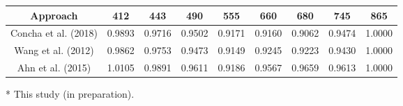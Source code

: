\documentclass[preview]{standalone}
\begin{document}
\begin{threeparttable}

\normalsize
\centering
\begin{tabular}{ccccccccc} 
 \hline 
Approach 			& 412 	 & 443 	  & 490    & 555    & 660    & 680    & 745    & 865    \\ \hline
Concha et al. (2018)\tnote{*} & 0.9893 & 0.9716 & 0.9502 & 0.9171 & 0.9160 & 0.9062 & 0.9474 & 1.0000 \\
Wang et al. (2012) 	& 0.9862 & 0.9753 & 0.9473 & 0.9149 & 0.9245 & 0.9223 & 0.9430 & 1.0000 \\
Ahn et al. (2015) 	& 1.0105 & 0.9891 & 0.9611 & 0.9186 & 0.9567 & 0.9659 & 0.9613 & 1.0000 \\

\hline 
\end{tabular}
\begin{tablenotes}\small
\item [*] This study (in preparation).
\end{tablenotes}
\end{threeparttable}
\end{document}
